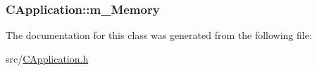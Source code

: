 \subsubsection[{\texorpdfstring{m\+\_\+\+Memory}{m_Memory}}]{ C\+Application\+::m\+\_\+\+Memory\hspace{0.3cm}{\ttfamily [protected]}}\hypertarget{classCApplication_a338eac28666e5f1577716eb7097ffadb}{}\label{classCApplication_a338eac28666e5f1577716eb7097ffadb}


The documentation for this class was generated from the following file\+:\begin{DoxyCompactItemize}
\item 
src/\hyperlink{CApplication_8h}{C\+Application.\+h}\end{DoxyCompactItemize}
